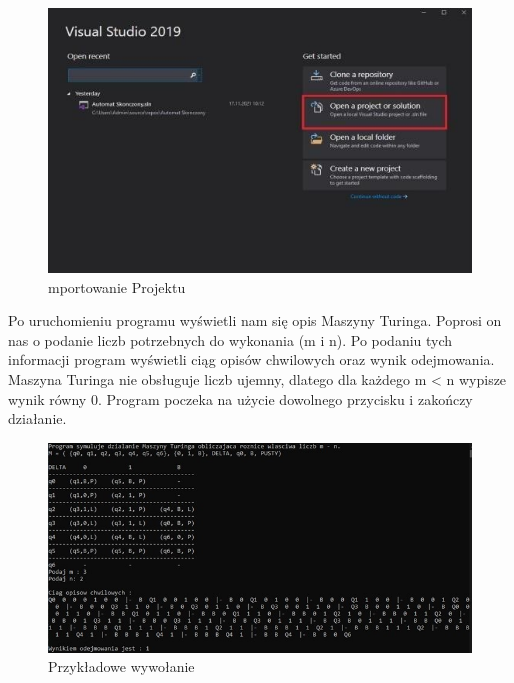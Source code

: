 \documentclass[10pt, a4paper]{report}
\begin{document}
    \begin{figure}[h]
        \begin{center}
            \includegraphics[scale=1]{photo2.jpg}
            \caption{mportowanie Projektu}
        \end{center}
    \end{figure}

    Po uruchomieniu programu wyświetli nam się opis Maszyny Turinga. Poprosi on nas o podanie liczb potrzebnych do
    wykonania (m i n). Po podaniu tych informacji program wyświetli ciąg opisów chwilowych oraz wynik odejmowania. Maszyna
    Turinga nie obsługuje liczb ujemny, dlatego dla każdego m < n wypisze wynik równy 0. Program poczeka na użycie dowolnego
    przycisku i zakończy działanie.

    \begin{figure}[h]
        \begin{center}
            \includegraphics[scale=0.8]{photo3.jpg}
            \caption{Przykładowe wywołanie}
        \end{center}
    \end{figure}
\end{document}
